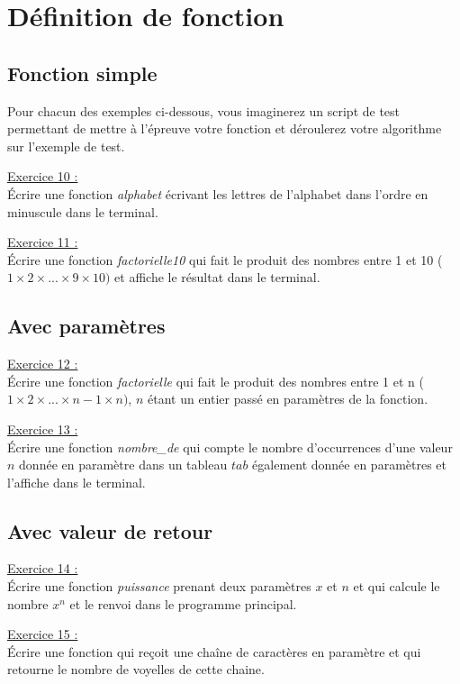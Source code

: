 \newpage
\section*{Définition de fonction}

\subsection*{Fonction simple}

Pour chacun des exemples ci-dessous, vous imaginerez un script de test permettant de mettre à l'épreuve votre fonction et déroulerez votre algorithme sur l'exemple de test.

\underline{Exercice 10 :}\\
Écrire une fonction \textit{alphabet} écrivant les lettres de l'alphabet dans l'ordre en minuscule dans le terminal.

\underline{Exercice 11 :}\\
Écrire une fonction \textit{factorielle10} qui fait le produit des nombres entre 1 et 10 ($1 \times 2 \times ... \times 9 \times 10)$ et affiche le résultat dans le terminal.

\subsection*{Avec paramètres}

\underline{Exercice 12 :}\\
Écrire une fonction \textit{factorielle} qui fait le produit des nombres entre 1 et n ($1 \times 2 \times ... \times n-1 \times n)$, $n$ étant un entier passé en paramètres de la fonction.

\underline{Exercice 13 :}\\
Écrire une fonction \textit{nombre\_de} qui compte le nombre d'occurrences d'une valeur $n$ donnée en paramètre dans un tableau $tab$ également donnée en paramètres et l'affiche dans le terminal.

\subsection*{Avec valeur de retour}

\underline{Exercice 14 :}\\
Écrire une fonction \textit{puissance} prenant deux paramètres $x$ et $n$ et qui calcule le nombre $x^n$ et le renvoi dans le programme principal.

\underline{Exercice 15 :}\\
Écrire une fonction qui reçoit une chaîne de caractères en paramètre et qui retourne le nombre de voyelles de cette chaine.

